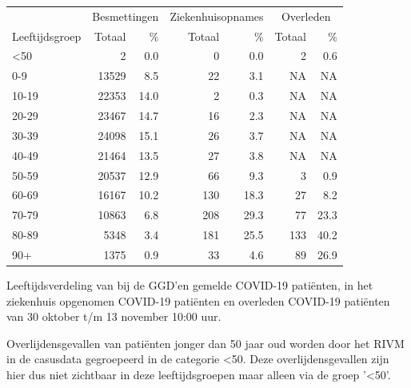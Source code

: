 \documentclass[
  english,
  man,floatsintext]{apa6}
\begin{document}
\begin{table}
\centering\begingroup\fontsize{11}{13}\selectfont

\begin{threeparttable}
\begin{tabular}{lrrrrrr}
\toprule
\multicolumn{1}{c}{ } & \multicolumn{2}{c}{Besmettingen} & \multicolumn{2}{c}{Ziekenhuisopnames} & \multicolumn{2}{c}{Overleden} \\
\cmidrule(l{3pt}r{3pt}){2-3} \cmidrule(l{3pt}r{3pt}){4-5} \cmidrule(l{3pt}r{3pt}){6-7}
Leeftijdsgroep & Totaal & \% & Totaal & \% & Totaal & \%\\
\midrule
<50 & 2 & 0.0 & 0 & 0.0 & 2 & 0.6\\
0-9 & 13529 & 8.5 & 22 & 3.1 & NA & NA\\
10-19 & 22353 & 14.0 & 2 & 0.3 & NA & NA\\
20-29 & 23467 & 14.7 & 16 & 2.3 & NA & NA\\
30-39 & 24098 & 15.1 & 26 & 3.7 & NA & NA\\
40-49 & 21464 & 13.5 & 27 & 3.8 & NA & NA\\
50-59 & 20537 & 12.9 & 66 & 9.3 & 3 & 0.9\\
60-69 & 16167 & 10.2 & 130 & 18.3 & 27 & 8.2\\
70-79 & 10863 & 6.8 & 208 & 29.3 & 77 & 23.3\\
80-89 & 5348 & 3.4 & 181 & 25.5 & 133 & 40.2\\
90+ & 1375 & 0.9 & 33 & 4.6 & 89 & 26.9\\
\bottomrule
\end{tabular}
\begin{tablenotes}
\item[1] Leeftijdsverdeling van bij de GGD’en gemelde COVID-19 patiënten, in het ziekenhuis opgenomen COVID-19 patiënten en overleden COVID-19 patiënten van 30 oktober t/m 13 november 10:00 uur.
\item[2] Overlijdensgevallen van patiënten jonger dan 50 jaar oud worden door het RIVM in de casusdata gegroepeerd in de categorie <50. Deze overlijdensgevallen zijn hier dus niet zichtbaar in deze leeftijdsgroepen maar alleen via de groep '<50'.
\end{tablenotes}
\end{threeparttable}
\endgroup{}
\end{table}

\newpage
\end{document}
